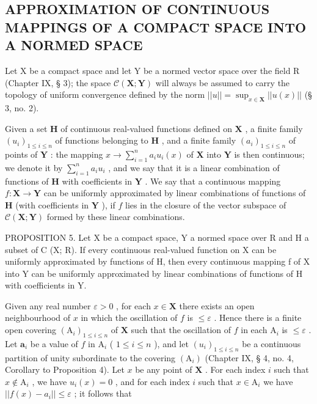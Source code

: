 \subsection{APPROXIMATION OF CONTINUOUS MAPPINGS OF A COMPACT SPACE INTO A NORMED SPACE}

Let X be a compact space and let Y be a normed vector space over the field R (Chapter IX, § 3); the space \(\mathcal{C}(\mathbf{X};\mathbf{Y})\) will always be assumed to carry the topology of uniform convergence defined by the norm \(||u|| = \sup_{x\in \mathbf{X}}||u(x)||\) (§ 3, no. 2).

Given a set \(\mathbf{H}\) of continuous real-valued functions defined on \(\mathbf{X}\) , a finite family \((u_i)_{1\leqslant i\leqslant n}\) of functions belonging to \(\mathbf{H}\) , and a finite family \((a_i)_{1\leqslant i\leqslant n}\) of points of \(\mathbf{Y}\) : the mapping \(x\to \sum_{i = 1}^{n}a_iu_i(x)\) of \(\mathbf{X}\) into \(\mathbf{Y}\) is then continuous; we denote it by \(\sum_{i = 1}^{n}a_iu_i\) , and we say that it is a linear combination of functions of \(\mathbf{H}\) with coefficients in \(\mathbf{Y}\) . We say that a continuous mapping \(f:\mathbf{X}\rightarrow \mathbf{Y}\) can be uniformly approximated by linear combinations of functions of \(\mathbf{H}\) (with coefficients in \(\mathbf{Y}\) ), if \(f\) lies in the closure of the vector subspace of \(\mathcal{C}(\mathbf{X};\mathbf{Y})\) formed by these linear combinations.

PROPOSITION 5. Let X be a compact space, Y a normed space over R and H a subset of C (X; R). If every continuous real-valued function on X can be uniformly approximated by functions of H, then every continuous mapping f of X into Y can be uniformly approximated by linear combinations of functions of H with coefficients in Y.

Given any real number \(\varepsilon > 0\) , for each \(x \in \mathbf{X}\) there exists an open neighbourhood of \(x\) in which the oscillation of \(f\) is \(\leqslant \varepsilon\) . Hence there is a finite open covering \((\mathrm{A}_i)_{1 \leqslant i \leqslant n}\) of \(\mathbf{X}\) such that the oscillation of \(f\) in each \(\mathrm{A}_i\) is \(\leqslant \varepsilon\) . Let \(\boldsymbol{a}_i\) be a value of \(f\) in \(\mathrm{A}_i\) ( \(1 \leqslant i \leqslant n\) ), and let \((u_i)_{1 \leqslant i \leqslant n}\) be a continuous partition of unity subordinate to the covering \((\mathrm{A}_i)\) (Chapter IX, § 4, no. 4, Corollary to Proposition 4). Let \(x\) be any point of \(\mathbf{X}\) . For each index \(i\) such that \(x \notin \mathrm{A}_i\) , we have \(u_i(x) = 0\) , and for each index \(i\) such that \(x \in \mathrm{A}_i\) we have \(||f(x) - a_i|| \leqslant \varepsilon\) ; it follows that

